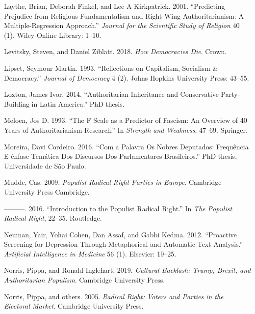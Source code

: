 \documentclass[12 pt,]{article}
\begin{document}
\leavevmode\hypertarget{ref-laythe2001predicting}{}%
Laythe, Brian, Deborah Finkel, and Lee A Kirkpatrick. 2001. ``Predicting
Prejudice from Religious Fundamentalism and Right-Wing Authoritarianism:
A Multiple-Regression Approach.'' \emph{Journal for the Scientific Study
of Religion} 40 (1). Wiley Online Library: 1--10.

\leavevmode\hypertarget{ref-levitsky2018democracies}{}%
Levitsky, Steven, and Daniel Ziblatt. 2018. \emph{How Democracies Die}.
Crown.

\leavevmode\hypertarget{ref-lipset1993reflections}{}%
Lipset, Seymour Martin. 1993. ``Reflections on Capitalism, Socialism \&
Democracy.'' \emph{Journal of Democracy} 4 (2). Johns Hopkins University
Press: 43--55.

\leavevmode\hypertarget{ref-loxton2014authoritarian}{}%
Loxton, James Ivor. 2014. ``Authoritarian Inheritance and Conservative
Party-Building in Latin America.'' PhD thesis.

\leavevmode\hypertarget{ref-meloen1993f}{}%
Meloen, Jos D. 1993. ``The F Scale as a Predictor of Fascism: An
Overview of 40 Years of Authoritarianism Research.'' In \emph{Strength
and Weakness}, 47--69. Springer.

\leavevmode\hypertarget{ref-moreira2016palavra}{}%
Moreira, Davi Cordeiro. 2016. ``Com a Palavra Os Nobres Deputados:
Frequência E ênfase Temática Dos Discursos Dos Parlamentares
Brasileiros.'' PhD thesis, Universidade de São Paulo.

\leavevmode\hypertarget{ref-mudde2009populist}{}%
Mudde, Cas. 2009. \emph{Populist Radical Right Parties in Europe}.
Cambridge University Press Cambridge.

\leavevmode\hypertarget{ref-mudde2016introduction}{}%
---------. 2016. ``Introduction to the Populist Radical Right.'' In
\emph{The Populist Radical Right}, 22--35. Routledge.

\leavevmode\hypertarget{ref-neuman2012proactive}{}%
Neuman, Yair, Yohai Cohen, Dan Assaf, and Gabbi Kedma. 2012. ``Proactive
Screening for Depression Through Metaphorical and Automatic Text
Analysis.'' \emph{Artificial Intelligence in Medicine} 56 (1). Elsevier:
19--25.

\leavevmode\hypertarget{ref-norris2019cultural}{}%
Norris, Pippa, and Ronald Inglehart. 2019. \emph{Cultural Backlash:
Trump, Brexit, and Authoritarian Populism}. Cambridge University Press.

\leavevmode\hypertarget{ref-norris2005radical}{}%
Norris, Pippa, and others. 2005. \emph{Radical Right: Voters and Parties
in the Electoral Market}. Cambridge University Press.
\end{document}
